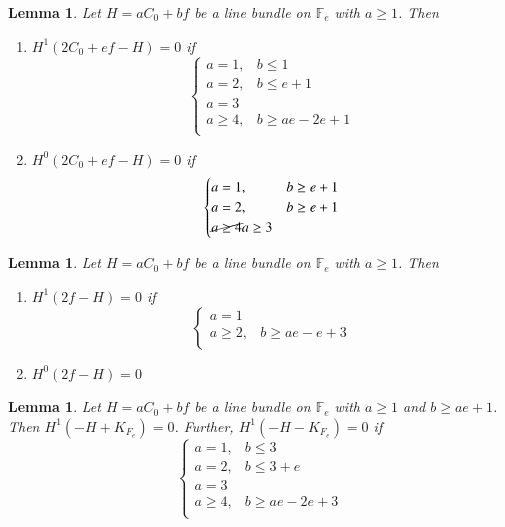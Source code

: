 \documentclass[11pt,twoside]{amsart}
\theoremstyle{plain}
\numberwithin{equation}{section}
\newtheorem{lemma}[theorem]{Lemma}
\theoremstyle{definition}
\begin{document}
\begin{lemma}\label{2C_0+ef-H}
Let $H = aC_0+bf$ be a line bundle on $\mathbb{F}_e$ with $a \geq 1$. Then 
\begin{enumerate}
    \item[(1)] $H^1(2C_0+ef-H) = 0$ if 
\[
\begin{cases}
   a = 1, & b \leq 1  \\
   a = 2, & b \leq e+1 \\
   a = 3 & \\
   a \geq 4, & b \geq ae-2e+1 \\
\end{cases}
\]

\item[(2)] $H^0(2C_0+ef-H) = 0$ if 
\[
\begin{cases}
   a = 1, & b \geq e+1  \\
   a = 2, & b \geq e+1 \\
   \cancel{a \geq 4} a \geq 3 & \\
\end{cases}
\] 

\end{enumerate}

    
\end{lemma}

\begin{lemma}\label{2f-H}
Let $H = aC_0+bf$ be a line bundle on $\mathbb{F}_e$ with $a \geq 1$. Then 
\begin{enumerate}
    \item[(1)] $H^1(2f-H) = 0$ if 
\[
\begin{cases}
   a = 1 &   \\
   a \geq 2, & b \geq ae-e+3 \\
   
\end{cases}
\]

\item[(2)] $H^0(2f-H) = 0$ 



\end{enumerate}  

\end{lemma}


\begin{lemma}\label{-H-K_Y}
Let $H = aC_0+bf$ be a line bundle on $\mathbb{F}_e$ with $a \geq 1$ and $b \geq ae+1$. Then $H^1(-H+K_{F_e}) = 0$. Further, $H^1(-H-K_{F_e}) = 0$ if 
 \[
\begin{cases}
   a = 1, & b \leq 3  \\
   a = 2, & b \leq 3+e \\
   a = 3 & \\
   a \geq 4, & b \geq ae-2e+3 \\
\end{cases}
 \]

\end{lemma}
\end{document}
